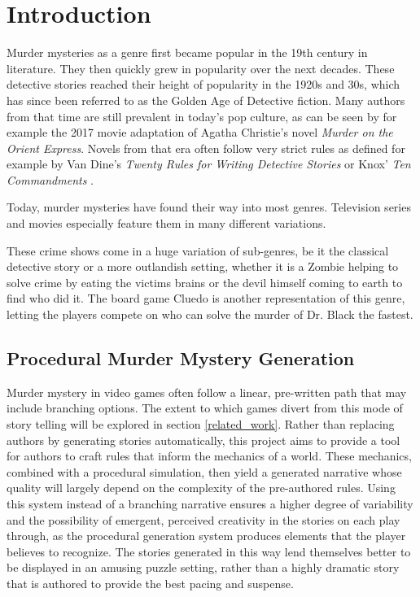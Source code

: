 \section{Introduction} \label{introduction}

Murder mysteries as a genre first became popular in the 19th century in literature.
They then quickly grew in popularity over the next decades.
These detective stories reached their height of popularity in the 1920s and 30s, which has since been referred to as the Golden Age of Detective fiction.
Many authors from that time are still prevalent in today's pop culture, as can be seen by for example the 2017 movie adaptation of Agatha Christie's novel \emph{Murder on the Orient Express}.
Novels from that era often follow very strict rules as defined for example by Van Dine's \emph{Twenty Rules for Writing Detective Stories} or Knox' \emph{Ten Commandments} \cite{van_dine_1928, knox_1929}.

Today, murder mysteries have found their way into most genres.
Television series and movies especially feature them in many different variations.

These crime shows come in a huge variation of sub-genres, be it the classical detective story or a more outlandish setting, whether it is a Zombie helping to solve crime by eating the victims brains or the devil himself coming to earth to find who did it. 
The board game Cluedo is another representation of this genre, letting the players compete on who can solve the murder of Dr. Black the fastest.

\subsection{Procedural Murder Mystery Generation}
Murder mystery in video games often follow a linear, pre-written path that may include branching options.
The extent to which games divert from this mode of story telling will be explored in section \ref{related_work}.
Rather than replacing authors by generating stories automatically, this project aims to provide a tool for authors to craft rules that inform the mechanics of a world.
These mechanics, combined with a procedural simulation, then yield a generated narrative whose quality will largely depend on the complexity of the pre-authored rules.
Using this system instead of a branching narrative ensures a higher degree of variability and the possibility of emergent, perceived creativity in the stories on each play through, as the procedural generation system produces elements that the player believes to recognize.
The stories generated in this way lend themselves better to be displayed in an amusing puzzle setting, rather than a highly dramatic story that is authored to provide the best pacing and suspense.

